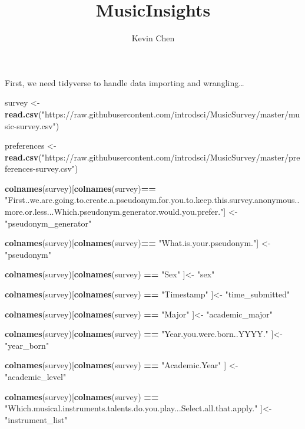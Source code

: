 \documentclass[]{article}
\title{MusicInsights}
\author{Kevin Chen}
\date{}
\newenvironment{Shaded}{\begin{snugshade}}{\end{snugshade}}
\newcommand{\KeywordTok}[1]{\textcolor[rgb]{0.13,0.29,0.53}{\textbf{#1}}}
\newcommand{\NormalTok}[1]{#1}
\newcommand{\OperatorTok}[1]{\textcolor[rgb]{0.81,0.36,0.00}{\textbf{#1}}}
\newcommand{\StringTok}[1]{\textcolor[rgb]{0.31,0.60,0.02}{#1}}
\begin{document}
\maketitle

First, we need tidyverse to handle data importing and wrangling\ldots{}

\begin{Shaded}
\begin{Highlighting}[]
\NormalTok{survey <-}\StringTok{ }\KeywordTok{read.csv}\NormalTok{(}\StringTok{"https://raw.githubusercontent.com/introdsci/MusicSurvey/master/music-survey.csv"}\NormalTok{)}

\NormalTok{preferences <-}\KeywordTok{read.csv}\NormalTok{(}\StringTok{"https://raw.githubusercontent.com/introdsci/MusicSurvey/master/preferences-survey.csv"}\NormalTok{)}

\KeywordTok{colnames}\NormalTok{(survey)[}\KeywordTok{colnames}\NormalTok{(survey)}\OperatorTok{==}\StringTok{ "First..we.are.going.to.create.a.pseudonym.for.you.to.keep.this.survey.anonymous..more.or.less...Which.pseudonym.generator.would.you.prefer."}\NormalTok{] <-}\StringTok{ "pseudonym_generator"}

\KeywordTok{colnames}\NormalTok{(survey)[}\KeywordTok{colnames}\NormalTok{(survey)}\OperatorTok{==}\StringTok{ "What.is.your.pseudonym."}\NormalTok{] <-}\StringTok{ "pseudonym"}

\KeywordTok{colnames}\NormalTok{(survey)[}\KeywordTok{colnames}\NormalTok{(survey) }\OperatorTok{==}\StringTok{ "Sex"}\NormalTok{ ]<-}\StringTok{ "sex"}

\KeywordTok{colnames}\NormalTok{(survey)[}\KeywordTok{colnames}\NormalTok{(survey) }\OperatorTok{==}\StringTok{ "Timestamp"}\NormalTok{ ]<-}\StringTok{ "time_submitted"}

\KeywordTok{colnames}\NormalTok{(survey)[}\KeywordTok{colnames}\NormalTok{(survey) }\OperatorTok{==}\StringTok{ "Major"}\NormalTok{ ]<-}\StringTok{ "academic_major"}

\KeywordTok{colnames}\NormalTok{(survey)[}\KeywordTok{colnames}\NormalTok{(survey) }\OperatorTok{==}\StringTok{ "Year.you.were.born..YYYY."}\NormalTok{ ]<-}\StringTok{"year_born"}

\KeywordTok{colnames}\NormalTok{(survey)[}\KeywordTok{colnames}\NormalTok{(survey) }\OperatorTok{==}\StringTok{ "Academic.Year"}\NormalTok{ ] <-}\StringTok{ "academic_level"}

\KeywordTok{colnames}\NormalTok{(survey)[}\KeywordTok{colnames}\NormalTok{(survey) }\OperatorTok{==}\StringTok{ "Which.musical.instruments.talents.do.you.play...Select.all.that.apply."}\NormalTok{ ]<-}\StringTok{ "instrument_list"}


\end{Highlighting}
\end{Shaded}
\end{document}
